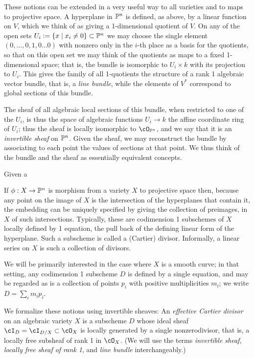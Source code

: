 These notions can be extended in a very useful way to all varieties and to maps to projective space. A hyperplane in $\PP^n$ is defined, as above, by a linear function on $V$, which we think of as giving a 1-dimensional quotient of $V$. On any of the open sets $U_i := \{x \mid x_i \neq 0\} \subset \PP^n$ we may choose the single element $(0,\dots,0,1,0\dots 0)$ with
nonzero only in the $i$-th place as a basis for the quotients, so that on this open set we may think of the quotients as maps to a fixed 1-dimensional space; that is, the bundle is isomorphic to 
$U_i \times k$ with its projection to $U_i$. This gives the family of all 1-quotients the structure of a rank 1 algebraic vector bundle, that is, a \emph{line bundle}, while the elements of $V^*$ correspond to global sections of this bundle.

The sheaf of all algebraic local sections of this bundle, when restricted to one of the $U_i$, is thus the space of algebraic functions $U_i \to k$ the affine coordinate ring of $U_i$; thus the sheaf is locally isomorphic to $\cO_{\PP^n}$, and we say that it is an \emph{invertible sheaf} on $\PP^n$. Given the sheaf, we may reconstruct the bundle by associating to each point the values of sections at that point. We thus think of the bundle and the sheaf as essentially equivalent concepts.

Given a
 


If $\phi: X\to \PP^{n}$ is morphism from a variety $X$ to projective space then, because any point on the image of $X$ is the intersection of the hyperplanes that contain it, the embedding can be uniquely specified by giving the collection of preimages, in $X$ of such intersections. Typically, these are codimension 1
subschemes of $X$ locally defined by 1 equation, the pull back of the defining linear form of the hyperplane. Such a subscheme is called a (Cartier) divisor. Informally, a linear series on $X$ is such a collection of divisors.

We will be primarily interested in the case where $X$ is a smooth curve; in that setting, any codimension 1 subscheme $D$ is defined by a single equation, and may be regarded as is a collection of points $p_{i}$ with  positive multiplicities
$m_{i}$; we write $D = \sum_{i}m_{i}p_{i}$.

We formalize these notions using invertible sheaves:
An \emph{effective Cartier divisor} on an algebraic variety $X$ is a subscheme $D$ whose ideal sheaf $\cI_{D} = \cI_{D/X}\subset \cO_{X}$ is locally generated by a single nonzerodivisor, that is, a locally free subsheaf of rank 1 in $\cO_{X}$. (We will use the terms 
\emph{invertible sheaf}, \emph{locally free sheaf of rank 1}, and \emph{line bundle} interchangeably.)


